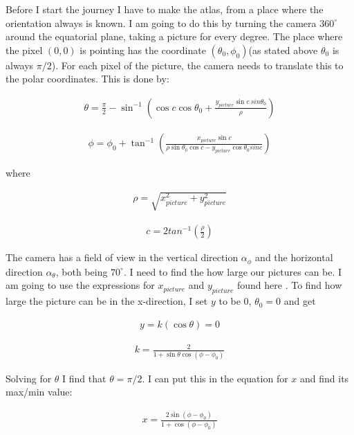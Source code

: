 \documentclass[a4paper, 10pt]{article}
\begin{document}
Before I start the journey I have to make the atlas, from a place where the orientation always is known. I am going to do this by turning the camera $360^\circ$ around the equatorial plane, taking a picture for every degree. The place where the pixel $(0,0)$ is pointing has the coordinate $(\theta_0,\phi_0)$(as stated above $\theta_0$ is always $\pi/2$). For each pixel of the picture, the camera needs to translate this to the polar coordinates. This is done by: 

\begin{align}
\theta = \frac{\pi}{2} - \sin^{-1}\left( \cos c \cos \theta_0 + \frac{y_{picture}\sin c\ sin \theta_0}{\rho} \right)
\end{align}

\begin{align}
\phi = \phi_0 + \tan^{-1} \left( \frac{x_{picture}\sin c}{\rho \sin \theta_0 \cos c - y_{picture}\cos \theta_0 sin c} \right)
\end{align}

where 

\begin{align}
\rho = \sqrt{x_{picture}^2 + y_{picture}^2}
\end{align}

\begin{align}
c = 2tan^{-1} \left( \frac{\rho}{2} \right)
\end{align}


The camera has a field of view in the vertical direction $\alpha_{\phi}$ and the horizontal direction $\alpha_{\theta}$, both being $70^\circ$. I need to find the how large our pictures can be. I am going to use the expressions for $x_{picture}$ and $y_{picture}$ found here \cite{part4}. To find how large the picture can be in the x-direction, I set $y$ to be $0$, $\theta_0 = 0$ and get

\begin{align}
y = k(\cos \theta ) = 0
\end{align}

\begin{align}
k = \frac{2}{1+\sin \theta \cos (\phi - \phi_0)}
\end{align}

Solving for $\theta$ I find that $\theta = \pi/2$. I can put this in the equation for $x$ and find its max/min value:

\begin{align}
x = \frac{2 \sin(\phi - \phi_0)}{1+\cos (\phi - \phi_0)}
\end{align}
\end{document}
